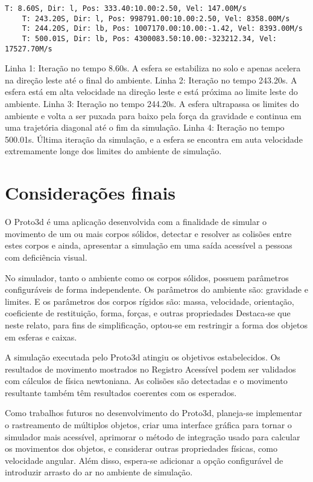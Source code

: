 \documentclass[12pt]{article}
\begin{document}
\begin{lstlisting}[frame=single,caption=Esfera sobre o chão e saída do ambiente\label{lg:esferaM4}]
	T: 8.60S, Dir: l, Pos: 333.40:10.00:2.50, Vel: 147.00M/s
	T: 243.20S, Dir: l, Pos: 998791.00:10.00:2.50, Vel: 8358.00M/s
	T: 244.20S, Dir: lb, Pos: 1007170.00:10.00:-1.42, Vel: 8393.00M/s
	T: 500.01S, Dir: lb, Pos: 4300083.50:10.00:-323212.34, Vel: 17527.70M/s
\end{lstlisting}

Linha 1: Iteração no tempo 8.60s. A esfera se estabiliza no solo e apenas acelera na direção leste até o final do ambiente.
Linha 2: Iteração no tempo 243.20s. A esfera está em alta velocidade na direção leste e está próxima ao limite leste do ambiente.
Linha 3: Iteração no tempo 244.20s. A esfera ultrapassa os limites do ambiente e volta a ser puxada para baixo pela força da gravidade e continua em uma trajetória diagonal até o fim da simulação.
Linha 4: Iteração no tempo 500.01s. Última iteração da simulação, e a esfera se encontra em auta velocidade extremamente longe dos limites do ambiente de simulação.

\section{Considerações finais}
O Proto3d é uma aplicação desenvolvida com a finalidade de simular o movimento de um ou mais corpos sólidos, detectar e resolver as colisões entre estes corpos e ainda, apresentar a simulação em uma saída acessível a pessoas com deficiência visual.

No simulador, tanto o ambiente como os corpos sólidos, possuem parâmetros configuráveis de forma independente. Os parâmetros do ambiente são:  gravidade e limites. E os parâmetros dos corpos rígidos são: massa, velocidade, orientação, coeficiente de restituição, forma, forças, e outras propriedades Destaca-se que neste relato, para fins de simplificação, optou-se em restringir a forma dos objetos em esferas e caixas.

A simulação executada pelo Proto3d atingiu os objetivos estabelecidos. Os resultados de movimento mostrados no Registro Acessível podem ser validados com cálculos de física newtoniana. As colisões são detectadas e o movimento resultante também têm resultados coerentes com os esperados. 

Como trabalhos futuros no desenvolvimento do Proto3d, planeja-se implementar o rastreamento de múltiplos objetos, criar uma interface gráfica para tornar o simulador mais acessível, aprimorar o método de integração usado para calcular os movimentos dos objetos, e considerar outras propriedades físicas, como velocidade angular. Além disso, espera-se adicionar a opção configurável de introduzir arrasto do ar no ambiente de simulação.



\end{document}
